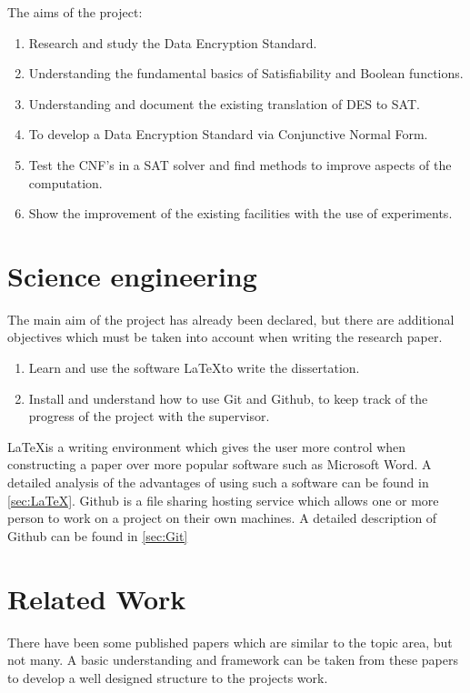 \documentclass[11pt,a4paper]{report}
\begin{document}
The aims of the project:

\begin{enumerate}
\item Research and study the Data Encryption Standard.
\item Understanding the fundamental basics of Satisfiability and Boolean functions.
\item Understanding and document the existing translation of DES to SAT.
\item To develop a Data Encryption Standard via Conjunctive Normal Form.
\item Test the CNF's in a SAT solver and find methods to improve aspects of the computation.
\item Show the improvement of the existing facilities with the use of experiments.
\end{enumerate}


\section{Science engineering}
\label{sec:sciEng}
The main aim of the project has already been declared, but there are additional objectives which must be taken into account when writing the research paper.
\begin{enumerate}
\item Learn and use the software \LaTeX \space to write the dissertation.
\item Install and understand how to use Git and Github, to keep track of the progress of the project with the supervisor.
\end{enumerate}
\LaTeX \space is a writing environment which gives the user more control when constructing a paper over more popular software such as Microsoft Word. A detailed analysis of the advantages of using such a software can be found in \ref{sec:LaTeX}.
Github is a file sharing hosting service which allows one or more person to work on a project on their own machines. A detailed description of Github can be found in \ref{sec:Git}



\section{Related Work}
\label{cha:RWork}

There have been some published papers which are similar to the topic area, but not many. A basic understanding and framework can be taken from these papers to develop a well designed structure to the projects work.
\end{document}

